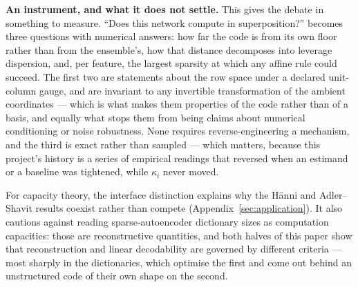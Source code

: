 \textbf{An instrument, and what it does not settle.} This gives the debate
in~\cite{bhagat2026cc,ferreiradasilva2026l4} something to measure. ``Does this network compute in
superposition?'' becomes three questions with numerical answers: how far the code is from its own
floor rather than from the ensemble's, how that distance decomposes into leverage dispersion, and, per
feature, the largest sparsity at which any affine rule could succeed. The first two are statements
about the row space under a declared unit-column gauge, and are invariant to any invertible
transformation of the ambient coordinates --- which is what makes them properties of the code rather
than of a basis, and equally what stops them from being claims about numerical conditioning or
noise robustness. None requires
reverse-engineering a mechanism, and the third is exact rather than sampled --- which matters, because
this project's history is a series of empirical readings that reversed when an estimand or a baseline
was tightened, while $\kappa_i$ never moved.

For capacity theory, the interface distinction explains why the H\"{a}nni and Adler--Shavit results
coexist rather than compete (Appendix~\ref{sec:application}). It also cautions against reading
sparse-autoencoder dictionary sizes as computation capacities: those are reconstructive quantities,
and both halves of this paper show that reconstruction and linear decodability are governed by
different criteria --- most sharply in the dictionaries, which optimise the first and come out behind
an unstructured code of their own shape on the second.
